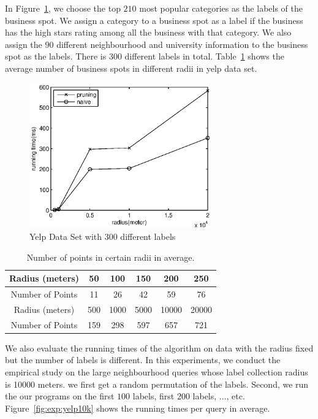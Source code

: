 In Figure~\ref{fig:exp:yelp300l}, we choose the top $210$ most popular categories as the labels of the business spot. We assign a category to a business spot as a label if the business has the high stars rating among all the business with that category. We also assign the $90$ different neighbourhood and university information to the business spot as the labels. There is 300 different labels in total. Table~\ref{tab:exp:radius} shows the average number of business spots in different radii in yelp data set.

\begin{figure}[h]
    \centering
      \includegraphics[width=0.7\textwidth]{figs/Yelp300Labels}
    \caption{\label{fig:exp:yelp300l}Yelp Data Set with 300 different labels}
\end{figure}


\begin{table}[h]
\centering
\begin{tabular}{|c|c|c|c|c|c|}
\hline
Radius (meters)  & 50  & 100  & 150  & 200   & 250   \\ \hline
Number of Points & 11  & 26   & 42   & 59    & 76    \\ \hline
Radius (meters)  & 500 & 1000 & 5000 & 10000 & 20000 \\ \hline
Number of Points & 159 & 298  & 597  & 657   & 721  \\ \hline
\end{tabular}
\caption{\label{tab:exp:radius}Number of points in certain radii in average.}
\end{table}

We also evaluate the running times of the algorithm on data with the radius fixed but the number of labels is different. In this experiments, we conduct the empirical study on the large neighbourhood queries whose label collection radius is 10000 meters. we first get a random permutation of the labels. Second, we run the our programs on the first $100$ labels, first $200$ labels, $\dots$, etc. Figure~\ref{fig:exp:yelp10k} shows the running times per query in average.


